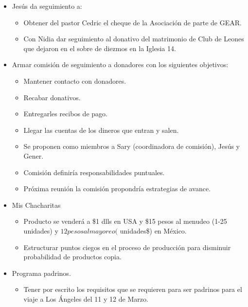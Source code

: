 \documentclass[]{book}
\providecommand{\tightlist}{%
  \setlength{\itemsep}{0pt}\setlength{\parskip}{0pt}}
\begin{document}
\begin{itemize}
\tightlist
\item
  Jesús da seguimiento a:

  \begin{itemize}
  \tightlist
  \item
    Obtener del pastor Cedric el cheque de la Asociación de parte de
    GEAR.
  \item
    Con Nidia dar seguimiento al donativo del matrimonio de Club de
    Leones que dejaron en el sobre de diezmos en la Iglesia 14.
  \end{itemize}
\item
  Armar comisión de seguimiento a donadores con los siguientes
  objetivos:

  \begin{itemize}
  \tightlist
  \item
    Mantener contacto con donadores.
  \item
    Recabar donativos.
  \item
    Entregarles recibos de pago.
  \item
    Llegar las cuentas de los dineros que entran y salen.
  \item
    Se proponen como miembros a Sary (coordinadora de comisión), Jesús y
    Gener.
  \item
    Comisión definiría responsabilidades puntuales.
  \item
    Próxima reunión la comisión propondría estrategias de avance.
  \end{itemize}
\item
  Mis Chacharitas

  \begin{itemize}
  \tightlist
  \item
    Producto se venderá a \$1 dlls en USA y \$15 pesos al menudeo (1-25
    unidades) y \(12 pesos al mayoreo (\) unidades\$) en México.
  \item
    Estructurar puntos ciegos en el proceso de producción para disminuir
    probabilidad de productos copia.
  \end{itemize}
\item
  Programa padrinos.

  \begin{itemize}
  \tightlist
  \item
    Tener por escrito los requisitos que se requieren para ser padrinos
    para el viaje a Los Ángeles del 11 y 12 de Marzo.
  \end{itemize}
\end{itemize}
\end{document}
